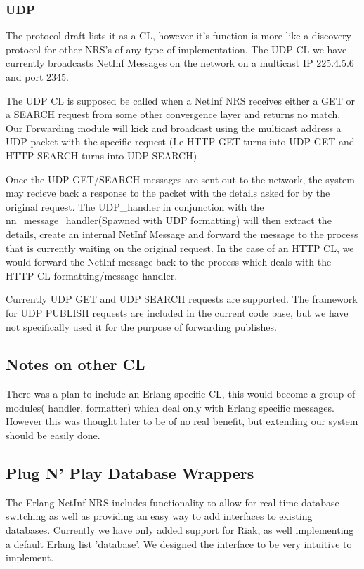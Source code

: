 \documentclass[11pt]{report}
\begin{document}
\subsubsection{UDP}

The protocol draft lists it as a CL, however it's function is more like a discovery protocol for other NRS's of any type of implementation. The UDP CL we have currently broadcasts NetInf Messages on the network on a multicast IP 225.4.5.6 and port 2345. 

The UDP CL is supposed be called when a NetInf NRS receives either a GET or a SEARCH request from some other convergence layer and returns no match. Our Forwarding module will kick and broadcast using the multicast address a UDP packet with the specific request (I.e HTTP GET turns into UDP GET and HTTP SEARCH turns into UDP SEARCH)

Once the UDP GET/SEARCH messages are sent out to the network, the system may recieve back a response to the packet with the details asked for by the original request. The UDP\_handler in conjunction with the nn\_message\_handler(Spawned with UDP formatting) will then extract the details, create an internal NetInf Message and forward the message to the process that is currently waiting on the original request. In the case of an HTTP CL, we would forward the NetInf message back to the process which deals with the HTTP CL formatting/message handler.

Currently UDP GET and UDP SEARCH requests are supported. The framework for UDP PUBLISH requests are included in the current code base, but we have not specifically used it for the purpose of forwarding publishes. 

\subsection {Notes on other CL}

There was a plan to include an Erlang specific CL, this would become a group of modules( handler, formatter) which deal only with Erlang specific messages. However this was thought later to be of no real benefit, but extending our system should be easily done. 

\subsection {Plug N' Play Database Wrappers}

The Erlang NetInf NRS includes functionality to allow for real-time database switching as well as providing an easy way to add interfaces to existing databases. Currently we have only added support for Riak, as well implementing a default Erlang list 'database'.  We designed the interface to be very intuitive to implement.
\end{document}
